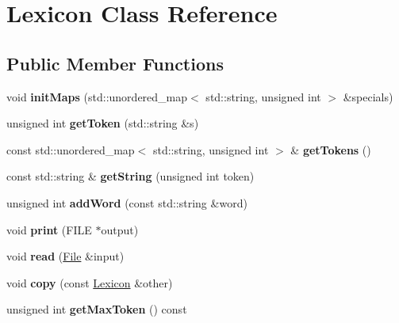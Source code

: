 \hypertarget{classLexicon}{}\section{Lexicon Class Reference}
\label{classLexicon}
\subsection*{Public Member Functions}
\begin{DoxyCompactItemize}
\item 
\mbox{\label{classLexicon_ab98081cb72cada5ba51138752d81d898}} 
void {\bfseries init\+Maps} (std\+::unordered\+\_\+map$<$ std\+::string, unsigned int $>$ \&specials)
\item 
\mbox{\label{classLexicon_a97daf7fd0ec322c4a64c94207467d9f0}} 
unsigned int {\bfseries get\+Token} (std\+::string \&s)
\item 
\mbox{\label{classLexicon_a7a286b953dc921e936d07ba514e929fe}} 
const std\+::unordered\+\_\+map$<$ std\+::string, unsigned int $>$ \& {\bfseries get\+Tokens} ()
\item 
\mbox{\label{classLexicon_a328ff05786103c14ee4b0330829f3121}} 
const std\+::string \& {\bfseries get\+String} (unsigned int token)
\item 
\mbox{\label{classLexicon_a94b037e129bab580cdee396c8db8244c}} 
unsigned int {\bfseries add\+Word} (const std\+::string \&word)
\item 
\mbox{\label{classLexicon_a7126d888d4fceb8a58d21eb7ef95c2d6}} 
void {\bfseries print} (F\+I\+LE $\ast$output)
\item 
\mbox{\label{classLexicon_a7b3d53999b6e75aee8ffd2bb45ffdf70}} 
void {\bfseries read} (\hyperlink{classFile}{File} \&input)
\item 
\mbox{\label{classLexicon_af4ed9570b9575341c43442150c1a748a}} 
void {\bfseries copy} (const \hyperlink{classLexicon}{Lexicon} \&other)
\item 
\mbox{\label{classLexicon_a25a9fff92015f05e2b315e31e74bee2f}} 
unsigned int {\bfseries get\+Max\+Token} () const
\end{DoxyCompactItemize}
